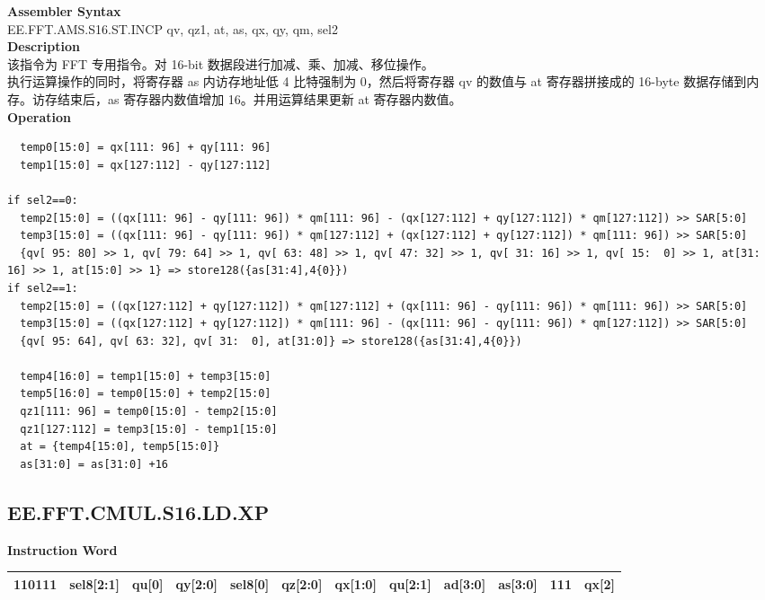 \textbf{Assembler Syntax} \\
EE.FFT.AMS.S16.ST.INCP qv, qz1, at, as, qx, qy, qm, sel2 \\
\textbf{Description} \\
该指令为 FFT 专用指令。对 16-bit 数据段进行加减、乘、加减、移位操作。\\
执行运算操作的同时，将寄存器 as 内访存地址低 4 比特强制为 0，然后将寄存器 qv 的数值与 at 寄存器拼接成的 16-byte 数据存储到内存。访存结束后，as 寄存器内数值增加 16。并用运算结果更新 at 寄存器内数值。\\
\textbf{Operation}
\begin{lstlisting}
  temp0[15:0] = qx[111: 96] + qy[111: 96]
  temp1[15:0] = qx[127:112] - qy[127:112]

if sel2==0:
  temp2[15:0] = ((qx[111: 96] - qy[111: 96]) * qm[111: 96] - (qx[127:112] + qy[127:112]) * qm[127:112]) >> SAR[5:0]
  temp3[15:0] = ((qx[111: 96] - qy[111: 96]) * qm[127:112] + (qx[127:112] + qy[127:112]) * qm[111: 96]) >> SAR[5:0]
  {qv[ 95: 80] >> 1, qv[ 79: 64] >> 1, qv[ 63: 48] >> 1, qv[ 47: 32] >> 1, qv[ 31: 16] >> 1, qv[ 15:  0] >> 1, at[31: 16] >> 1, at[15:0] >> 1} => store128({as[31:4],4{0}})
if sel2==1:
  temp2[15:0] = ((qx[127:112] + qy[127:112]) * qm[127:112] + (qx[111: 96] - qy[111: 96]) * qm[111: 96]) >> SAR[5:0]
  temp3[15:0] = ((qx[127:112] + qy[127:112]) * qm[111: 96] - (qx[111: 96] - qy[111: 96]) * qm[127:112]) >> SAR[5:0]
  {qv[ 95: 64], qv[ 63: 32], qv[ 31:  0], at[31:0]} => store128({as[31:4],4{0}})

  temp4[16:0] = temp1[15:0] + temp3[15:0]
  temp5[16:0] = temp0[15:0] + temp2[15:0]
  qz1[111: 96] = temp0[15:0] - temp2[15:0]
  qz1[127:112] = temp3[15:0] - temp1[15:0]
  at = {temp4[15:0], temp5[15:0]}
  as[31:0] = as[31:0] +16
\end{lstlisting}

\clearpage
\subsection{EE.FFT.CMUL.S16.LD.XP}\label{instruction:EEFFTCMULS16LDXP}
\setlength\tabcolsep{6pt}
\textbf{Instruction Word} \\
\begin{tabular}{|c|c|c|c|c|c|c|c|c|c|c|c|}
	\hline
	110111 & sel8[2:1] & qu[0] & qy[2:0] & sel8[0] & qz[2:0] & qx[1:0] & qu[2:1] & ad[3:0] & as[3:0] & 111 & qx[2] \\
	\hline
\end{tabular}

